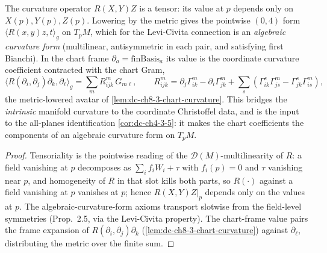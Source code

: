 \begin{lemma}
  \label{lem:dc-ch8-3-pointwise-curvature-form}


  The curvature operator $R(X,Y)Z$ is a tensor: its value at $p$ depends only on
  $X(p),Y(p),Z(p)$. Lowering by the
  metric gives the pointwise $(0,4)$ form $\langle R(x,y)z,t\rangle_g$ on
  $T_pM$, which for the Levi-Civita connection is an \emph{algebraic curvature
  form} (multilinear, antisymmetric in each pair, and satisfying first Bianchi).
  In the chart frame $\partial_a=\text{finBasis}_a$ its value is the
  coordinate curvature coefficient contracted with the chart Gram,
  $$\langle R(\partial_i,\partial_j)\partial_k,\partial_\ell\rangle_g
    = \sum_m R^m_{ijk}\,G_{m\ell},\qquad
    R^m_{ijk}=\partial_j\Gamma^m_{ik}-\partial_i\Gamma^m_{jk}
      +\sum_s(\Gamma^s_{ik}\Gamma^m_{js}-\Gamma^s_{jk}\Gamma^m_{is}),$$
  the metric-lowered avatar of \cref{lem:dc-ch8-3-chart-curvature}. This bridges
  the \emph{intrinsic} manifold curvature to the coordinate Christoffel data, and
  is the input to the all-planes identification \cref{cor:dc-ch4-3-5}: it makes the
  chart coefficients the components of an algebraic curvature form on $T_pM$.
\end{lemma}
\begin{proof}

\sketch
  Tensoriality is the pointwise reading of the $\mathcal D(M)$-multilinearity of
  $R$: a field vanishing at $p$ decomposes as $\sum_i f_i W_i+\tau$ with
  $f_i(p)=0$ and $\tau$ vanishing near $p$, and homogeneity of $R$ in that slot
  kills both parts, so $R(\cdot)$ against a field vanishing at $p$ vanishes at
  $p$; hence $R(X,Y)Z|_p$ depends only on the values at $p$. The
  algebraic-curvature-form axioms transport slotwise from the field-level
  symmetries (Prop.~2.5, via the Levi-Civita property). The chart-frame value
  pairs the frame expansion of $R(\partial_i,\partial_j)\partial_k$
  (\cref{lem:dc-ch8-3-chart-curvature}) against $\partial_\ell$, distributing the
  metric over the finite sum.
\end{proof}

